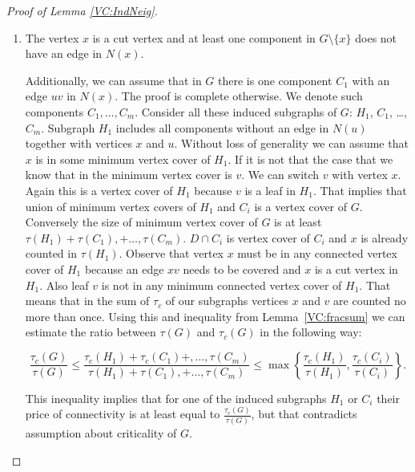 \begin{proof}[Proof of Lemma \ref{VC:IndNeig}]
\begin{enumerate}
	We need to find an upper bound for a size of a minimum connected vertex cover of \(G\).
	The union of minimum connected vertex covers of \(C_i\) and vertex \(x\) make a connected vertex cover of \(G\).
	The reason is that each vertex cover of \(C_i\) contains at least one neighbor of \(x\) due to edges in \(V(C_i) \cap N(x)\).
	This yields the following upper bound:
		\[\tau_c(G) \leq {\sum_{i=1}^{m}{\tau_c(C_i)} + 1}.\]
	Let us combine all estimates together and then use Lemma~\ref{VC:fracsum}:

	\[\frac{\tau_c(G)}{\tau(G)} \leq {\frac{\tau_c(C_1) +, \dots, + \tau_c(C_m) + 1}{\tau(C_1) +,\dots, + \tau(C_m) + 1}} 
	\leq \max\left\{ \frac{\tau_c(C_i)}{\tau(C_i)}, 1\right\}.\]

	Again we have a contradiction with the assumption that \(G\) is critical.	

\item 
	The vertex \(x\) is a cut vertex and at least one component in \(G \setminus \{x\}\) does not have an edge in \(N(x)\).

	Additionally, we can assume that in \(G\) there is one component \(C_1\) with an edge \(uv\) in \(N(x)\). 
	The proof is complete otherwise.
	We denote such components \(C_1, \dots, C_m\).
	Consider all these induced subgraphs of \(G\): \(H_1\), \(C_1\), \dots, \(C_m\).
	Subgraph \(H_1\) includes all components without an edge in \(N(u)\) together with vertices \(x\) and \(u\).
	Without loss of generality we can assume that \(x\) is in some minimum vertex cover of \(H_1\). If it is not that the case that we know that in the minimum vertex cover is \(v\).
	We can switch \(v\) with vertex \(x\). Again this is a vertex cover of \(H_1\) because \(v\) is a leaf in \(H_1\).
	That implies that union of minimum vertex covers of \(H_1\) and \(C_i\) is a vertex cover of \(G\). 
	Conversely the size of minimum vertex cover of \(G\) is at least \(\tau(H_1) + \tau(C_1), + \dots, \tau(C_m)\).
	\(D \cap C_i\) is vertex cover of \(C_i\) and \(x\) is already counted in \(\tau(H_1)\).
	Observe that vertex \(x\) must be in any connected vertex cover of \(H_1\) because an edge \(xv\) needs to be covered and \(x\) is a cut vertex in \(H_1\).
	Also leaf \(v\) is not in any minimum connected vertex cover of \(H_1\). That means that in the sum of \(\tau_c\) of our subgraphs vertices \(x\) and \(v\)
	are counted no more than once.
	Using this and inequality from Lemma~\ref{VC:fracsum} we can estimate the ratio between \(\tau(G)\) and \(\tau_c(G)\) in the following way:	
	
	\[\frac{\tau_c(G)}{\tau(G)} \leq {\frac{\tau_c(H_1) + \tau_c(C_1) +, \dots, \tau(C_m)}{\tau(H_1) + \tau(C_1), + \dots, \tau(C_m) }} \leq 
	{\max\left\{ \frac{\tau_c(H_1)}{\tau(H_1)}, \frac{\tau_c(C_i)}{\tau(C_i)}\right\}}.\]

	This inequality implies that for one of the induced subgraphs \(H_1\) or \(C_i\) their price of connectivity is at least equal to \(\frac{\tau_c(G)}{\tau(G)}\), 
	but that contradicts assumption about criticality of \(G\). 
\end{enumerate}
\leavevmode
\end{proof}

